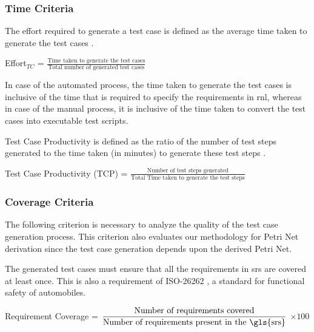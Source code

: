 \subsubsection{\textbf{Time Criteria}} 

\begin{definition}
\label{def:def5}

The effort required to generate a test case is defined as the average time taken to generate the test cases \cite{elghondakly2015waterfall}.

Effort$_{TC}$   = $\displaystyle\frac{\mbox{Time taken to generate the test cases}}{\mbox{Total number of generated test cases}}$

In case of the automated process, the time taken to generate the test cases is inclusive of the time that is required to specify the requirements in \gls{rnl}, whereas in case of the manual process, it is inclusive of the time taken to convert the test cases into executable test scripts.
\end{definition}

\begin{definition}
\label{def:def6}

Test Case Productivity is defined as the ratio of the number of test steps generated to the time taken (in minutes) to generate these test steps \cite{gulechha2009software}.

Test Case Productivity (TCP)   = $\displaystyle\frac{\mbox{Number of test steps generated}}{\mbox{Total Time taken to generate the test steps}}$
\end{definition}

\subsubsection{\textbf{Coverage Criteria}}
The following criterion is necessary to analyze the quality of the test case generation process. This criterion also evaluates our methodology for Petri Net derivation since the test case generation depends upon the derived Petri Net.

\begin{definition}
\label{def:def7}

The generated test cases must ensure that all the requirements in \gls{srs} are covered at least once. This is also a requirement of ISO-26262 \cite{iso201126262}, a standard for functional safety of automobiles.

Requirement Coverage = $\displaystyle\frac{\mbox{Number of requirements covered}}{\mbox{Number of requirements present in the \gls{srs}}}$  $\times 100$
\end{definition}

